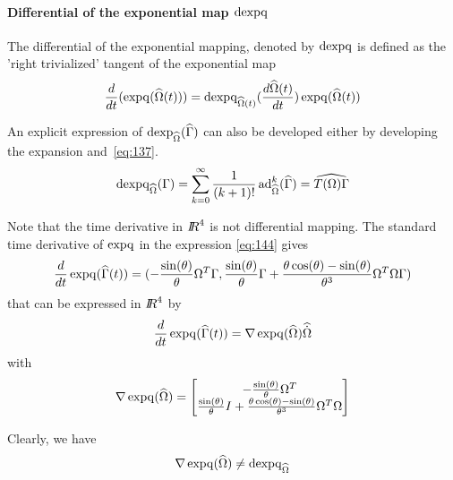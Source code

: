 \paragraph{Differential of the exponential map $\operatorname{dexpq}$}
The differential of the exponential mapping, denoted by $\operatorname{dexpq}$ is defined as the 'right trivialized' tangent of the exponential map 
\begin{equation}
  \label{eq:71}
  \frac{d}{dt} (\operatorname{expq}(\widehat \Omega(t))) = \operatorname{dexpq}_{\widehat\Omega(t)}(\frac{d \widehat{\Omega}(t)}{dt}) \operatorname{expq}(\widehat\Omega(t))
\end{equation}

An explicit expression of $\operatorname{dexp}_{\widehat\Omega}(\widehat\Gamma)$ can also be developed either by developing the expansion and~\eqref{eq:137}.
\begin{equation}
  \label{eq:168}
   \operatorname{dexpq}_{\widehat\Omega}(\Gamma) = \sum_{k=0}^\infty \frac{1}{(k+1)!} \operatorname{ad}_{\widehat\Omega}^k (\widehat\Gamma) = \widehat{T(\Omega)\Gamma}
\end{equation}

\begin{remark}
Note that the time derivative in $\mbox{\rm $I\!\!R$}^4$ is not differential mapping.
The standard time derivative of $\operatorname{expq}$ in the expression \eqref{eq:144} gives
\begin{equation}
  \label{eq:171}
    \frac{d}{dt}\operatorname{expq}(\widehat \Gamma(t)) = (- \frac{\sin(\theta)}{\theta} \Omega^T\Gamma, \frac{\sin(\theta)}{\theta}\Gamma  +\frac{\theta \cos(\theta)-\sin(\theta)}{\theta^3}\Omega^T\Omega \Gamma  )
\end{equation}
that can be expressed in $\mbox{\rm $I\!\!R$}^4$ by
\begin{equation}
  \label{eq:175}
  \frac{d}{dt}\operatorname{expq}(\widehat \Gamma(t))  = \nabla \operatorname{expq}(\widehat\Omega) \widehat{\dot\Omega} 
\end{equation}
with
\begin{equation}
  \label{eq:176}
  \nabla \operatorname{expq}(\widehat\Omega) =
  \begin{bmatrix}
    - \frac{\sin(\theta)}{\theta} \Omega^T \\
    \frac{\sin(\theta)}{\theta}I  +\frac{\theta \cos(\theta)-\sin(\theta)}{\theta^3}\Omega^T\Omega
  \end{bmatrix}
\end{equation}

Clearly, we have 
\begin{equation}
  \label{eq:177}
  \nabla \operatorname{expq}(\widehat\Omega) \neq  \operatorname{dexpq}_{\widehat\Omega}
\end{equation}
\end{remark}


